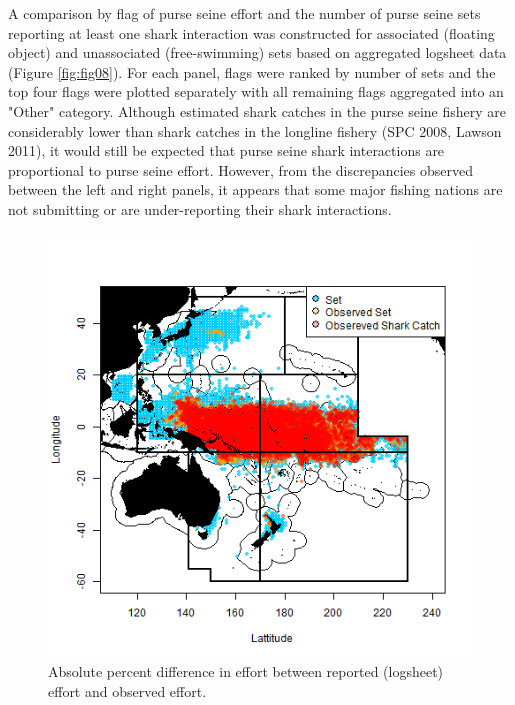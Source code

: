 \documentclass[12pt]{SCreport}
\begin{document}
A comparison by flag of purse seine effort and the number of purse seine sets reporting at least one shark interaction was constructed for associated (floating object) and unassociated (free-swimming) sets based on aggregated logsheet data (Figure \ref{fig:fig08}).  For each panel, flags were ranked by number of sets and the top four flags were plotted separately with all remaining flags aggregated into an "Other" category. Although estimated shark catches in the purse seine fishery are considerably lower than shark catches in the longline fishery (SPC 2008, Lawson 2011), it would still be expected that purse seine shark interactions are proportional to purse seine effort. However, from the discrepancies observed between the left and right panels, it appears that some major fishing nations are not submitting or are under-reporting their shark interactions.


\begin{figure}
\begin{center}
\includegraphics[scale=0.75]{../GRAPHICS/Defined/FIG_07_PS_sets}
\caption{\label{fig:fig07} Absolute percent difference in effort between reported (logsheet)  effort and observed effort.}
\end{center}
\end{figure}
\end{document}
